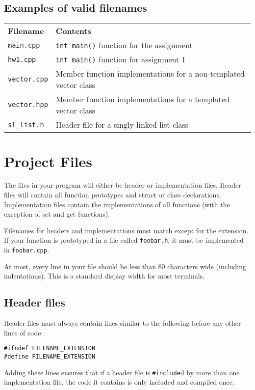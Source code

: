 \documentclass{article}
\newcommand{\code}[1]{\texttt{\colorbox{gray!30}{#1}}}
\begin{document}
\subsection{Examples of valid filenames}
\begin{tabular}{ll}
	\textbf{Filename} & \textbf{Contents} \\
	\code{main.cpp} & \code{int main()} function for the assignment \\
	\code{hw1.cpp} & \code{int main()} function for assignment 1 \\
	\code{vector.cpp} & Member function implementations for a non-templated vector class \\
	\code{vector.hpp} & Member function implementations for a templated vector class \\
	\code{sl\_list.h} & Header file for a singly-linked list class \\
\end{tabular}

\section{Project Files}
The files in your program will either be header or implementation files.
Header files will contain all function prototypes and struct or class declarations.
Implementation files contain the implementations of all functions (with the exception of set and get functions).

Filenames for headers and implementations must match except for the extension.
If your function is prototyped in a file called \code{foobar.h}, it must be implemented in \code{foobar.cpp}.

At most, every line in your file should be less than 80 characters wide (including indentations).
This is a standard display width for most terminals.

\subsection{Header files}
Header files must always contain lines similar to the following before any other lines of code:
\begin{lstlisting}
#ifndef FILENAME_EXTENSION
#define FILENAME_EXTENSION
\end{lstlisting}

Adding these lines ensures that if a header file is \code{\#include}d by more than one implementation file, the code it contains is only included and compiled once.
\end{document}
